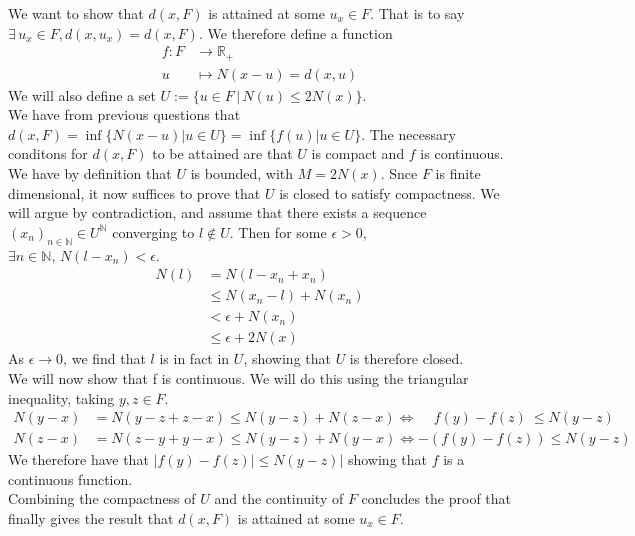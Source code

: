 \documentclass{article}
\begin{document}
We want to show that $d(x,F)$ is attained at some $u_x\in F$. That is to say $\exists \, u_x \in F, d(x,u_x) = d(x,F)$. We therefore define a function
	\begin{align*}
	f: F &\to \mathbb{R}_+\\
	u &\mapsto N(x-u) = d(x,u)
	\end{align*}
We will also define a set $U := \{u \in F \, | \, N(u) \leq 2N(x)\}$.\\ 
\noindent We have from previous questions that $d(x,F) = \inf\{ N(x-u) | u \in U\} = \inf\{ f(u) | u \in U\}$. The necessary conditons for $d(x,F)$ to be attained are that $U$ is compact and $f$ is continuous.\\
\noindent We have by definition that $U$ is bounded, with $M = 2N(x)$. Snce $F$ is finite dimensional, it now suffices to prove that $U$ is closed to satisfy compactness. We will argue by contradiction, and assume that there exists a sequence $(x_n)_{n \in \mathbb{N}} \in U^{\mathbb{N}}$ converging to $l \not \in U$. Then for some $\epsilon > 0$, $\exists n \in \mathbb{N}, \, N(l-x_n) < \epsilon$.
\begin{align*}
	N(l) &= N(l-x_n+x_n) \\
	&\leq N(x_n -l) + N(x_n) \\
	&< \epsilon + N(x_n) \\
	&\leq  \epsilon + 2N(x)
\end{align*}
As $\epsilon \rightarrow 0$, we find that $l$ is in fact in $U$, showing that $U$ is therefore closed.\\
\noindent We will now show that f is continuous. We will do this using the triangular inequality, taking $y, z \in F$. 
	\begin{align*}
		N(y-x) &= N(y-z+z-x) \leq N(y-z) + N(z-x) \Leftrightarrow \quad \, f(y) - f(z) \ \leq N(y-z)\\
		N(z-x) &= N(z-y+y-x) \leq N(y-z) + N(y-x) \Leftrightarrow -(f(y) - f(z)) \leq N(y-z)
	\end{align*}
We therefore have that $|f(y) - f(z)| \leq N(y-z)|$ showing that $f$ is a continuous function.\\
\noindent Combining the compactness of $U$ and the continuity of $F$ concludes the proof that  finally gives the result that $d(x,F)$ is attained at some $u_x\in F$.
\end{document}
